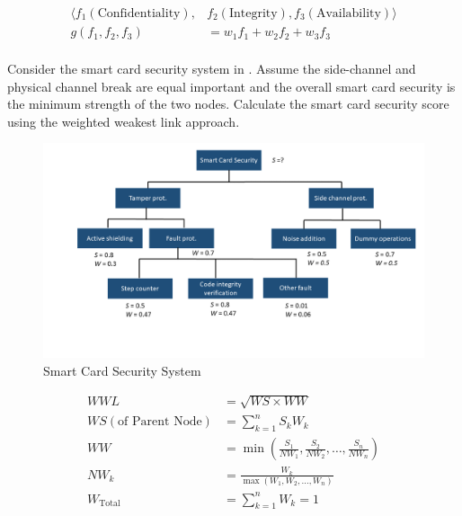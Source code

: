 \begin{questions}
\begin{parts}
\begin{solution}
      \begin{equation}\label{eq:CIA_Functions}
        \begin{aligned}
          \langle f_{1}(\text{Confidentiality}), &f_{2}(\text{Integrity}), f_{3}(\text{Availability}) \rangle \\
          g(f_{1}, f_{2}, f_{3}) &= w_{1} f_{1} + w_{2}f_{2} + w_{3}f_{3} \\
        \end{aligned}
      \end{equation}
    \end{solution}
  \end{parts}

\question{} Consider the smart card security system in .
  Assume the side-channel and physical channel break are equal important and the overall smart card security is the minimum strength of the two nodes.
  Calculate the smart card security score using the weighted weakest link approach.
  \begin{figure}[h!]
    \centering
    \includegraphics[scale=0.35]{./Drawings/EITP20-Secure_Systems_Engineering/Smart_Card_Security_System.png}
    \caption{Smart Card Security System}
    \label{fig:Smart_Card_Security_System}
  \end{figure}
  \begin{solution}
    \begin{equation}\label{eq:Weighted_Weakest_Link}
      \begin{aligned}
        WWL &= \sqrt{WS \times WW} \\
        WS(\text{of Parent Node}) &= \sum\limits_{k=1}^{n} S_{k}W_{k} \\
        WW &= \min \left( \frac{S_{1}}{NW_{1}}, \frac{S_{2}}{NW_{2}}, \ldots, \frac{S_{n}}{NW_{n}} \right) \\
        NW_{k} &= \frac{W_{k}}{\max(W_{1}, W_{2}, \ldots, W_{n})} \\
        W_{\mathrm{Total}} &= \sum\limits_{k=1}^{n} W_{k} = 1
      \end{aligned}
    \end{equation}
  \end{solution}


\end{questions}

